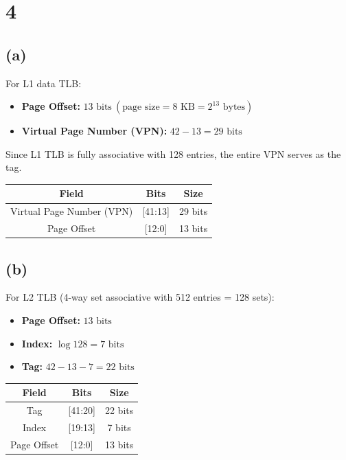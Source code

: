 \documentclass[12pt]{article}
\begin{document}
\section*{4}

\subsection*{(a)}

For L1 data TLB:
\begin{itemize}
    \item \textbf{Page Offset:} $13 \text{ bits} \ (\text{page size} = 8 \text{ KB} = 2^{13} \text{ bytes})$
    \item \textbf{Virtual Page Number (VPN):} $42 - 13 = 29 \text{ bits}$
\end{itemize}

Since L1 TLB is fully associative with 128 entries, the entire VPN serves as the tag.

\begin{table}[h]
    \centering
    \begin{tabular}{|c|c|c|}
    \hline
    \textbf{Field} & \textbf{Bits} & \textbf{Size} \\
    \hline
    Virtual Page Number (VPN) & [41:13] & 29 bits \\
    \hline
    Page Offset & [12:0] & 13 bits \\
    \hline
    \end{tabular}
\end{table}

\subsection*{(b)}

For L2 TLB (4-way set associative with 512 entries = 128 sets):
\begin{itemize}
    \item \textbf{Page Offset:} $13 \text{ bits}$
    \item \textbf{Index:} $\log 128 = 7 \text{ bits}$
    \item \textbf{Tag:} $42 - 13 - 7 = 22 \text{ bits}$
\end{itemize}

\begin{table}[h]
    \centering
    \begin{tabular}{|c|c|c|}
    \hline
    \textbf{Field} & \textbf{Bits} & \textbf{Size} \\
    \hline
    Tag & [41:20] & 22 bits \\
    \hline
    Index & [19:13] & 7 bits \\
    \hline
    Page Offset & [12:0] & 13 bits \\
    \hline
    \end{tabular}
\end{table}
\end{document}
